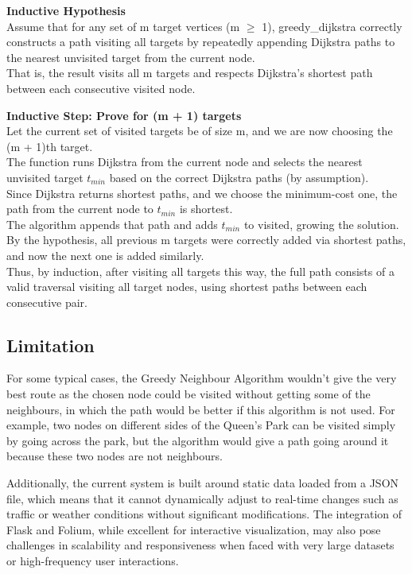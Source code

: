 \documentclass[12pt]{article}
\begin{document}
	\textbf{Inductive Hypothesis}\\
	Assume that for any set of m target vertices (m $\geq$ 1), greedy\_dijkstra correctly constructs a path visiting all targets by repeatedly appending Dijkstra paths to the nearest unvisited target from the current node.\\
	That is, the result visits all m targets and respects Dijkstra's shortest path between each consecutive visited node.
	
	\textbf{Inductive Step: Prove for (m + 1) targets}\\
	Let the current set of visited targets be of size m, and we are now choosing the (m + 1)th target.\\
	The function runs Dijkstra from the current node and selects the nearest unvisited target $t_{min}$ based on the correct Dijkstra paths (by assumption).\\
	Since Dijkstra returns shortest paths, and we choose the minimum-cost one, the path from the current node to $t_{min}$ is shortest.\\
	The algorithm appends that path and adds $t_{min}$ to visited, growing the solution.\\
	By the hypothesis, all previous m targets were correctly added via shortest paths, and now the next one is added similarly.\\
	Thus, by induction, after visiting all targets this way, the full path consists of a valid traversal visiting all target nodes, using shortest paths between each consecutive pair.
	
	\subsection*{Limitation}
	For some typical cases, the Greedy Neighbour Algorithm wouldn’t give the very best route as the chosen node could be visited without getting some of the neighbours, in which the path would be better if this algorithm is not used. For example, two nodes on different sides of the Queen’s Park can be visited simply by going across the park, but the algorithm would give a path going around it because these two nodes are not neighbours.
	
	Additionally, the current system is built around static data loaded from a JSON file, which means that it cannot dynamically adjust to real-time changes such as traffic or weather conditions without significant modifications. The integration of Flask and Folium, while excellent for interactive visualization, may also pose challenges in scalability and responsiveness when faced with very large datasets or high-frequency user interactions.
	
\end{document}
